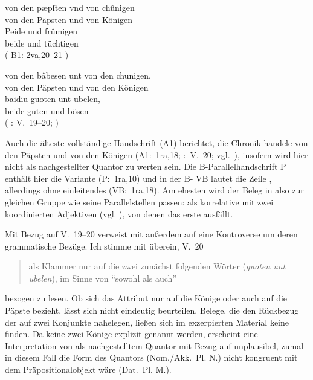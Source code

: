 \begin{exe}
\ex \begin{xlist}
	\ex \label{ex:kcexcl1}
		\gll von den pæpſten vnd von chûnigen \\
			von den Päpsten und von Königen \\
	\sn \gll Peide und frûmigen \\
			beide und tüchtigen \\
		\trans {}
			(%
				B1: 2va,20--21%
			)

	\ex \label{ex:kcexcl1_schroeder}
		\gll von den bâbesen unt von den chunigen, \\
			von den Päpsten und von den Königen \\
	\sn \gll baidiu guoten unt ubelen, \\
			beide guten und bösen \\
		\trans {}
			(%
				\KC: V.~19--20;
				\cite[79]{schroeder1895}%
			)
\end{xlist}
\end{exe}

Auch die älteste vollständige Handschrift (A1) berichtet, die Chronik handele
von den Päpsten und von den Königen   (A1:~1ra,18; \KC:~V.~20; vgl.~\cite[79]{schroeder1895}),
insofern wird  hier nicht als nachgestellter Quantor zu werten
sein. Die B-\allowbreak{}Pa\-ral\-lel\-hand\-schrift P enthält hier die
Variante   (P:~1ra,10) und in der B- VB
lautet die Zeile  ,
allerdings ohne einleitendes  (VB:~1ra,18). Am ehesten wird der
Beleg in  also zur gleichen Gruppe wie seine
Parallelstellen passen:  als korrelative
 mit zwei koordinierten Adjektiven
(vgl. ), von denen das erste ausfällt.

Mit Bezug auf V.~19--20 verweist \citet[26, Fußnote 45]{weis2022} mit
\citet[55, Fußnote 87]{dickhutbielsky2015} außerdem auf eine Kontroverse um
deren grammatische Bezüge. Ich stimme mit \citet[239]{haupt2019} überein, V.~20
\blockquote{als Klammer nur auf die zwei zunächst folgenden Wörter
(\textit{guoten unt ubelen}), im Sinne von \enquote{sowohl als auch}} bezogen
zu lesen. Ob sich das Attribut 
 nur auf die Könige oder auch auf die Päpste
bezieht, lässt sich nicht eindeutig beurteilen. Belege, die den
Rückbezug der   auf zwei Konjunkte nahelegen,
ließen sich im exzerpierten Material keine finden. Da keine zwei Könige
explizit genannt werden, erscheint eine Interpretation von  als
nachgestelltem Quantor  mit Bezug auf  
unplausibel, zumal in diesem Fall die Form des Quantors (Nom./Akk.~Pl. N.)
nicht kongruent mit dem Präpositionalobjekt wäre (Dat.~Pl. M.).

